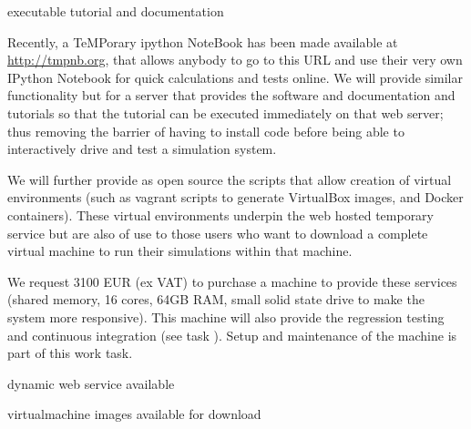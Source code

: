 \begin{workpackage}
\begin{wpdelivs}
  \begin{wpdeliv}[due=21,id=oommf-nb-documentation,dissem=??,nature=??]
      {\OOMMFNB{}    executable tutorial and documentation}
\end{wpdeliv}
\end{wpdelivs}


\begin{tasklist}
\begin{task}[id=oommf-nb-ve,title=OOMMF case study: \OOMMFNB{} virtual environments]
  Recently, a TeMPorary ipython NoteBook has been made available at
  \href{http://tmpnb.org}{http://tmpnb.org}, that allows anybody to go
  to this URL and use their very own IPython Notebook for quick
  calculations and tests online. We will provide similar functionality
  but for a server that provides the \OOMMFNB{} software and \OOMMFNB{}
  documentation and tutorials so that the tutorial can be executed
  immediately on that web server; thus removing the barrier of having
  to install code before being able to interactively drive and test a
  simulation system.

  We will further provide as open source the scripts that allow
  creation of virtual environments (such as vagrant scripts to
  generate VirtualBox images, and Docker containers). These virtual
  environments underpin the web hosted temporary \OOMMFNB{}
  service but are also of use to those users who want to download a
  complete virtual machine to run their simulations within that
  machine.

  We request 3100 EUR (ex VAT) to purchase a machine to provide these
  services (shared memory, 16 cores, 64GB RAM, small solid state drive
  to make the system more responsive). This machine will also provide
  the regression testing and continuous integration (see task
  ). Setup and
  maintenance of the machine is part of this work task.
\end{task}
\end{tasklist}

\begin{wpdelivs}
  \begin{wpdeliv}[due=24,id=oommf-nb-tmp,dissem=??,nature=??]
      {\OOMMFNB{} dynamic web service available}
\end{wpdeliv}
  \begin{wpdeliv}[due=24,id=oommf-nb-virtual,dissem=??,nature=??]
      {\OOMMFNB{} virtualmachine images available for download}
\end{wpdeliv}
\end{wpdelivs}



\end{workpackage}

